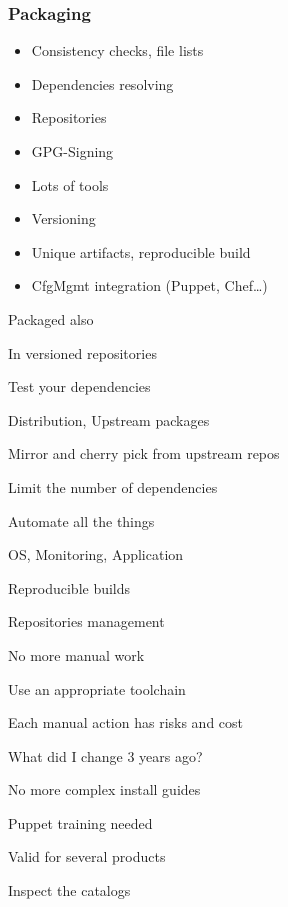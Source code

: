 \begin{frame}
    \frametitle{Packaging}
    \begin{itemize}
        \item {Consistency checks, file lists}
        \item {Dependencies resolving}
        \item {Repositories}
        \item {GPG-Signing}
        \item {Lots of tools}
        \item {Versioning}
        \item {Unique artifacts, reproducible build}
        \item {CfgMgmt integration (Puppet, Chef\dots)}
    \end{itemize}
\end{frame}

\begin{iframe}[Dependencies]
\item{Packaged also}
\item{In versioned repositories}
\item{Test your dependencies}
\item{Distribution, Upstream packages}
\item{Mirror and cherry pick from upstream repos}
\item{Limit the number of dependencies}
\end{iframe}


\begin{iframe}[Automation]
\item Automate all the things
\item OS, Monitoring, Application
\item Reproducible builds
\item Repositories management
\end{iframe}

\begin{iframe}
\item No more manual work
\item Use an appropriate toolchain
\item Each manual action has risks and cost
\item What did I change 3 years ago?
\end{iframe}

\begin{iframe}
\item No more complex install guides
\item Puppet training needed
\item Valid for several products
\item Inspect the catalogs
\end{iframe}

